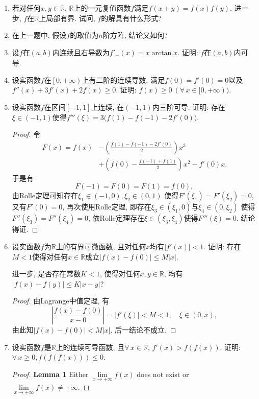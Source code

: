 \begin{1b}
\begin{enumerate}
\item 若对任何\(x,y\in\mathbb{R}\), \(\mathbb{R}\)上的一元复值函数\(f\)满足\(f(x+y)=f(x)f(y)\). 
进一步, \(f\)在\(\mathbb{R}\)上局部有界. 试问, \(f\)的解具有什么形式?
\item 在上一题中, 假设\(f\)的取值为\(n\)阶方阵, 结论又如何?
\item 设\(f\)在\((a,b)\)内连续且右导数为\(f'_+(x)=x\arctan x\). 
证明: \(f\)在\((a,b)\)内可导.
\item 设实函数\(f\)在\(\left[0,+\infty\right)\)上有二阶的连续导数, 
满足\(f(0)=f'(0)=0\)以及\(f''(x)+3f'(x)+2f(x)\geqslant 0\). 
证明: \(f(x)\geqslant 0\ (\forall\,x\in [0,+\infty))\).
\item 设实函数\(f\)在区间\([-1,1]\)上连续, 在\((-1,1)\)内三阶可导. 
证明: 存在\(\xi\in(-1,1)\)使得\(f'''(\xi)=3\big(f(1)-f(-1)-2f'(0)\big)\).
\begin{proof}
令\[\begin{split}
F(x)=f(x)&-\left(\frac{f(1)-f(-1)-2f'(0)}{2}\right)x^3\\
&+\left(f(0)-\frac{f(-1)+f(1)}{2}\right)x^2-f'(0)x.
\end{split}\]于是有\[F(-1)=F(0)=F(1)=f(0),\]
由Rolle定理可知存在\(\xi_1\in(-1,0), \xi_2\in(0,1)\)
使得\(F'(\xi_1)=F'(\xi_2)=0\), 又有\(F'(0)=0\),
再次使用Rolle定理, 即存在\(\xi_3\in(\xi_1,0)\)与\(\xi_4\in(0,\xi_2)\)
使得\(F''(\xi_3)=F''(\xi_4)=0\), 
依Rolle定理存在\(\xi\in(\xi_3,\xi_4)\)使得\(F'''(\xi)=0\). 结论得证.
\end{proof}
\item 设实函数\(f\)为\(\mathbb{R}\)上的有界可微函数, 且对任何\(x\)均有\(|f'(x)|<1\). 
证明: 存在\(M<1\)使得对任何\(x\in\mathbb{R}\)成立\(|f(x)-f(0)|\leqslant M|x|\).

进一步, 是否存在常数\(K<1\), 使得对任何\(x,y\in\mathbb{R}\), 均有\(|f(x)-f(y)|\leqslant K|x-y|\)?
\begin{proof}
由Lagrange中值定理, 有\[\left|\frac{f(x)-f(0)}{x-0}\right|=|f'(\xi)|<M<1,\quad \xi\in(0,x),\]
由此知\(|f(x)-f(0)|<M|x|\). 后一结论不成立.
\end{proof}
\item 设实函数\(f\)是\(\mathbb{R}\)上的连续可导函数, 
且\(\forall\, x\in\mathbb{R}\), \(f'(x)>f(f(x))\). 
证明: \(\forall\, x\geqslant 0,f(f(f(x)))\leqslant 0\).
\begin{proof}

\textbf{Lemma 1} Either $\lim\limits_{x \rightarrow+\infty} f(x)$ does not exist 
or $\lim\limits_{x \rightarrow+\infty} f(x) \neq+\infty$.


\end{proof}
\end{enumerate}
\end{1b}
